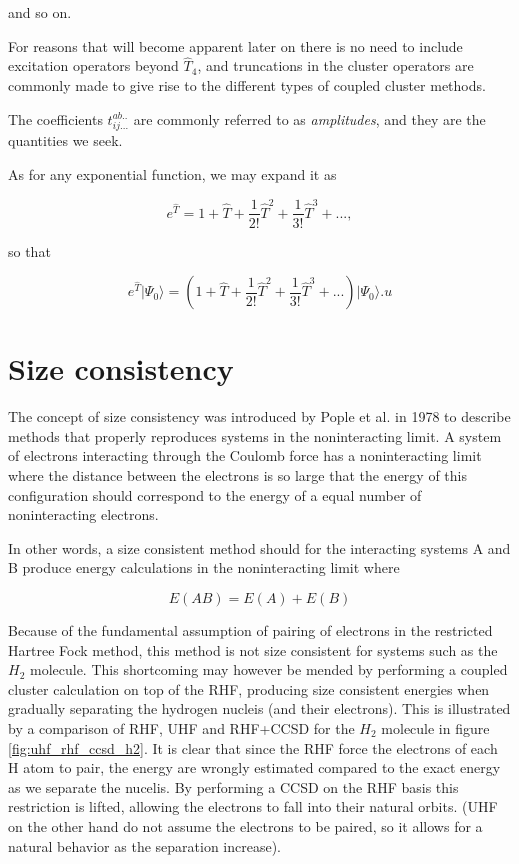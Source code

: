 and so on. 

For reasons that will become apparent later on there is no need to include excitation operators beyond $\hat{T}_4$, and truncations in the cluster operators are commonly made to give rise to the different types of coupled cluster methods. 

The coefficients $t^{ab..}_{ij...}$ are commonly referred to as \emph{amplitudes}, and they are the quantities we seek. 

As for any exponential function, we may expand it as

\begin{equation}
e^{\hat{T}} = 1 + \hat{T} + \frac{1}{2!} \hat{T}^2 + \frac{1}{3!} \hat{T}^3 + ... ,
\end{equation}

so that

\begin{equation}
e^{\hat{T}}  \vert \Psi_0 \rangle = (1 + \hat{T} + \frac{1}{2!} \hat{T}^2 + \frac{1}{3!} \hat{T}^3 + ...) \vert \Psi_0 \rangle .u
\end{equation}

\section{Size consistency}
The concept of size consistency was introduced by Pople et al. in 1978 \cite{Pople} to describe methods that properly reproduces systems in the noninteracting limit. A system of electrons interacting through the Coulomb force has a noninteracting limit where the distance between the electrons is so large that the energy of this configuration should correspond to the energy of a equal number of noninteracting electrons. 

In other words, a size consistent method should for the interacting systems A and B produce energy calculations in the noninteracting limit where \cite[p.12]{ShavittBartlett2009}

\begin{equation}
E(AB) = E(A) + E(B)
\end{equation}

Because of the fundamental assumption of pairing of electrons in the restricted Hartree Fock method, this method is not size consistent for systems such as the $H_2$ molecule. This shortcoming may however be mended by performing a coupled cluster calculation on top of the RHF, producing size consistent energies when gradually separating the hydrogen nucleis (and their electrons). This is illustrated by a comparison of RHF, UHF and RHF+CCSD for the $H_2$ molecule in figure \ref{fig:uhf_rhf_ccsd_h2}. It is clear that since the RHF force the electrons of each H atom to pair, the energy are wrongly estimated compared to the exact energy as we separate the nucelis. By performing a CCSD on the RHF basis this restriction is lifted, allowing the electrons to fall into their natural orbits. (UHF on the other hand do not assume the electrons to be paired, so it allows for a natural behavior as the separation increase).


